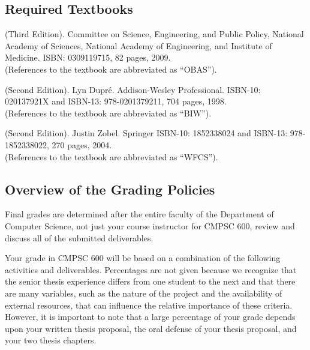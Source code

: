 \vspace{-.15in}
\subsection*{Required Textbooks}
\vspace{-.05in}

 (Third Edition).  Committee on Science,
Engineering, and Public Policy, National Academy of Sciences, National Academy of Engineering, and Institute of
Medicine. ISBN: 0309119715, 82 pages, 2009.\\ (References to the textbook are abbreviated as ``OBAS'').

 (Second Edition). Lyn Dupr\'e.  Addison-Wesley
Professional.  ISBN-10: 020137921X and ISBN-13: 978-0201379211, 704 pages, 1998.\\ (References to the textbook are
abbreviated as ``BIW'').

 (Second Edition).  Justin Zobel.  Springer ISBN-10: 1852338024 and ISBN-13:
978-1852338022, 270 pages, 2004. \\ (References to the textbook are abbreviated as ``WFCS'').

\vspace*{-.15in}
\subsection*{Overview of the Grading Policies}

Final grades are determined after the entire faculty of the Department of Computer Science, not just your course
instructor for CMPSC 600, review and discuss all of the submitted deliverables.

Your grade in CMPSC 600 will be based on a combination of the following activities and deliverables. Percentages are not
given because we recognize that the senior thesis experience differs from one student to the next and that there are many
variables, such as the nature of the project and the availability of external resources, that can influence the relative
importance of these criteria. However, it is important to note that a large percentage of your grade depends upon your
written thesis proposal, the oral defense of your thesis proposal, and your two thesis chapters.

\vspace*{-.05in}

